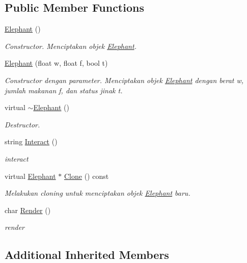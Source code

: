 \subsection*{Public Member Functions}
\begin{DoxyCompactItemize}
\item 
\hyperlink{classElephant_a372cc81064310f2f96db175b747647cb}{Elephant} ()
\begin{DoxyCompactList}\small\item\em Constructor. Menciptakan objek \hyperlink{classElephant}{Elephant}. \end{DoxyCompactList}\item 
\hyperlink{classElephant_a76bf83d1aacd5ff494532e14cf2a3bee}{Elephant} (float w, float f, bool t)
\begin{DoxyCompactList}\small\item\em Constructor dengan parameter. Menciptakan objek \hyperlink{classElephant}{Elephant} dengan berat w, jumlah makanan f, dan status jinak t. \end{DoxyCompactList}\item 
virtual \hyperlink{classElephant_aed5fb7142a24a101330af52652909075}{$\sim$\+Elephant} ()
\begin{DoxyCompactList}\small\item\em Destructor. \end{DoxyCompactList}\item 
string \hyperlink{classElephant_a4f2c4bef5ec886019ee88ad575f94fa7}{Interact} ()
\begin{DoxyCompactList}\small\item\em interact \end{DoxyCompactList}\item 
virtual \hyperlink{classElephant}{Elephant} $\ast$ \hyperlink{classElephant_a723a7c90f44a95d9886163e605aecea7}{Clone} () const 
\begin{DoxyCompactList}\small\item\em Melakukan cloning untuk menciptakan objek \hyperlink{classElephant}{Elephant} baru. \end{DoxyCompactList}\item 
char \hyperlink{classElephant_a7e412f36e1f88cd278dea76d4f383e95}{Render} ()
\begin{DoxyCompactList}\small\item\em render \end{DoxyCompactList}\end{DoxyCompactItemize}
\subsection*{Additional Inherited Members}


